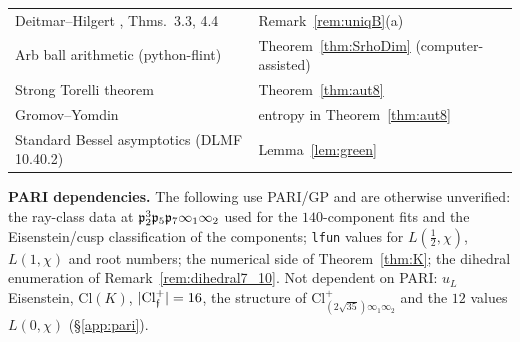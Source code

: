 \begin{center}
\begin{longtable}{p{5.2cm}p{9.4cm}}
Deitmar--Hilgert \cite{DH}, Thms.~3.3, 4.4 & Remark~\ref{rem:uniqB}(a)\\
Arb ball arithmetic (python-flint) & Theorem~\ref{thm:SrhoDim} (computer-assisted)\\
Strong Torelli theorem \cite{Huybrechts} & Theorem~\ref{thm:aut8}\\
Gromov--Yomdin \cite{GY} & entropy in Theorem~\ref{thm:aut8}\\
Standard Bessel asymptotics (DLMF 10.40.2) & Lemma~\ref{lem:green}\\
\bottomrule
\end{longtable}
\end{center}
\noindent\textbf{PARI dependencies.} The following use PARI/GP and are otherwise unverified: the ray-class data at $\mathfrak{p}_2^3\mathfrak{p}_5\mathfrak{p}_7\infty_1\infty_2$ used for the
$140$-component fits and the Eisenstein/cusp classification of the components; \texttt{lfun} values for $L(\tfrac12,\chi)$, $L(1,\chi)$ and root numbers; the
numerical side of Theorem~\ref{thm:K}; the dihedral enumeration of Remark~\ref{rem:dihedral7_10}. Not dependent on PARI: $u_L$ Eisenstein, $\mathrm{Cl}(K)$, $|\mathrm{Cl}^+_{\mathfrak{f}}|=16$, the structure of
$\mathrm{Cl}^+_{(2\sqrt{35})\infty_1\infty_2}$ and the $12$ values $L(0,\chi)$ (\S\ref{app:pari}).
